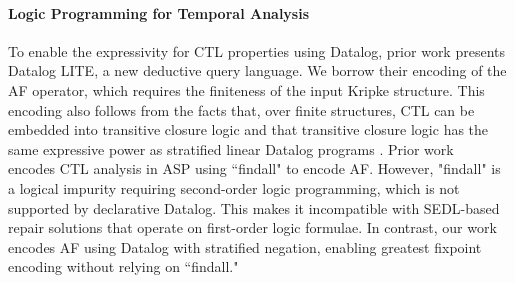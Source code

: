 








\paragraph*{\textbf{Logic Programming for Temporal Analysis}}

To enable the expressivity for CTL properties using Datalog, prior work \cite{gottlob2002datalog}
presents Datalog LITE, a new deductive query language. %
We borrow their encoding of the AF operator, 
which requires the finiteness of the input Kripke structure. 
This encoding also follows from the facts that, over finite structures, CTL can be embedded into transitive closure logic \cite{DBLP:conf/cav/ImmermanV97} and that transitive closure logic has the same expressive power as stratified linear Datalog programs \cite{DBLP:journals/tcs/ConsensM93,DBLP:conf/csl/Gradel91}. 
Prior work~\cite{rocca2014asp} encodes CTL analysis in ASP using ``findall" to encode AF. However, "findall" is a logical impurity requiring second-order logic programming, which is not supported by declarative Datalog. This makes it incompatible with SEDL-based repair solutions that operate on first-order logic formulae. In contrast, our work encodes AF using Datalog with stratified negation, enabling greatest fixpoint encoding without relying on ``findall."





